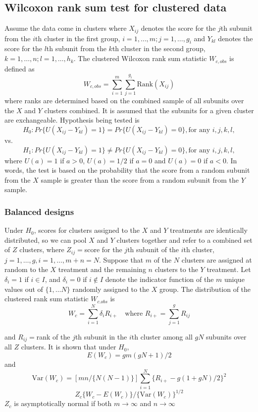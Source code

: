 \documentclass[article]{jss}
\begin{document}
\subsection{Wilcoxon rank sum test for clustered data}
Assume the data come in clusters where $X_{ij}$ denotes the score for the $j$th subunit from the $i$th cluster in the first group, $i = 1,\ldots,m; j = 1,\ldots,g_i$ and $Y_{kl}$ denotes the score for the $l$th subunit from the $k$th cluster in the second group, $k=1, \ldots,n;l=1,\ldots,h_k$. The clustered Wilcoxon rank sum statistic $W_{c,obs}$ is defined as 
\begin{equation}
W_{c,obs} = \sum_{i=1}^m\sum_{j=1}^{g_i}\text{Rank}(X_{ij})
\end{equation}
where ranks are determined based on the combined sample of all subunits over the $X$ and $Y$ clusters combined. It is assumed that the subunits for a given cluster are exchangeable. Hypothesis being tested is 
$$H_0: Pr\{U(X_{ij} - Y_{kl}) = 1\} = Pr\{U(X_{ij} - Y_{kl}) = 0\}, \text{for any }i, j, k, l,$$
vs.$$H_1:Pr\{U(X_{ij} - Y_{kl}) = 1\} \not = Pr\{U(X_{ij} - Y_{kl}) = 0\}, \text{for any }i, j, k, l,$$
where $U(a) = 1$ if $a > 0$, $U(a) = 1/2$ if $a = 0$ and $U(a) = 0$ if $a < 0$.
In words, the test is based on the probability that the score from a random subunit from the $X$ sample is greater than the score from a random subunit from the $Y$ sample. 
\subsubsection{Balanced designs}\label{bal}
Under $H_0$, scores for clusters assigned to the $X$ and $Y$ treatments are identically distributed, so we can pool $X$ and $Y$ clusters together and refer to a combined set of $Z$ clusters, where $Z_{ij} = $score for the $j$th subunit of the $i$th cluster, $j = 1,\ldots,g,i=1,\ldots,m+n = N$. Suppose that $m$ of the $N$ clusters are assigned at random to the $X$ treatment and the remaining $n$ clusters to the $Y$ treatment. Let $\delta_i = 1$ if $i\in I$, and $\delta_i = 0$ if $i \not \in I$ denote the indicator function of the $m$ unique values out of $\{1, \ldots N\}$ randomly assigned to the $X$ group.  The distribution of the clustered rank sum statistic $W_{c.obs}$ is
\begin{equation}\label{eq:Wc}
W_c = \sum^N_{i=1}\delta_iR_{i+} \quad \text{where   }R_{i+} = \sum^g_{j=1}R_{ij}
\end{equation}

and $R_{ij}=$rank of the $j$th subunit in the $i$th cluster among all $gN$ subunits over all $Z$ clusters. It is shown that under $H_0$, 
\begin{equation}\label{eq:EWc}
E(W_c) = gm(gN + 1)/2
\end{equation}
and 
\begin{equation}\label{eq:VWc}
\text{Var}(W_c) = [mn/\{N(N-1)\}]\sum^N_{i=1}\{R_{i+} - g(1+gN)/2\}^2
\end{equation}
\begin{equation}
Z_c \{W_c - E(W_c)\}/\{\text{Var}(W_c)\}^{1/2}
\end{equation}
$Z_c$ is asymptotically normal if both $m \to \infty$ and $n \to \infty$
\end{document}
